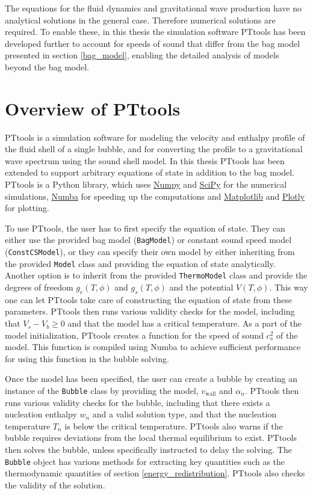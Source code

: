 The equations for the fluid dynamics and gravitational wave production have no analytical solutions in the general case.
Therefore numerical solutions are required.
To enable these, in this thesis the simulation software PTtools has been developed further to account for speeds of sound that differ from the bag model presented in section \ref{bag_model},
enabling the detailed analysis of models beyond the bag model.


\section{Overview of PTtools}
PTtools is a simulation software for modeling the velocity and enthalpy profile of the fluid shell of a single bubble,
and for converting the profile to a gravitational wave spectrum using the sound shell model.
In this thesis PTtools has been extended to support arbitrary equations of state in addition to the bag model.
PTtools is a Python library, which uses
\href{https://numpy.org/}{Numpy}
and
\href{https://scipy.org/}{SciPy}
for the numerical simulations,
\href{https://numba.pydata.org/}{Numba}
for speeding up the computations and
\href{https://matplotlib.org/}{Matplotlib}
and
\href{https://plotly.com/}{Plotly}
for plotting.

To use PTtools, the user has to first specify the equation of state.
They can either use the provided bag model (\texttt{BagModel}) or constant sound speed model (\texttt{ConstCSModel}),
or they can specify their own model by either inheriting from the provided \texttt{Model} class and providing the equation of state analytically.
Another option is to inherit from the provided \texttt{ThermoModel} class and provide the degrees of freedom $g_e(T,\phi)$ and $g_s(T,\phi)$ and the potential $V(T,\phi)$.
This way one can let PTtools take care of constructing the equation of state from these parameters.
PTtools then runs various validity checks for the model,
including that $V_s - V_b \geq 0$ and that the model has a critical temperature.
As a part of the model initialization, PTtools creates a function for the speed of sound $c_s^2$ of the model.
This function is compiled using Numba to achieve sufficient performance for using this function in the bubble solving.

Once the model has been specified,
the user can create a bubble by creating an instance of the \texttt{Bubble} class by providing the model, $v_\text{wall}$ and $\alpha_n$.
PTtools then runs various validity checks for the bubble,
including that there exists a nucleation enthalpy $w_n$ and a valid solution type,
and that the nucleation temperature $T_n$ is below the critical temperature.
PTtools also warns if the bubble requires deviations from the local thermal equilibrium to exist.
PTtools then solves the bubble, unless specifically instructed to delay the solving.
The \texttt{Bubble} object has various methods for extracting key quantities such as the thermodynamic quantities of section \ref{energy_redistribution}.
PTtools also checks the validity of the solution.

